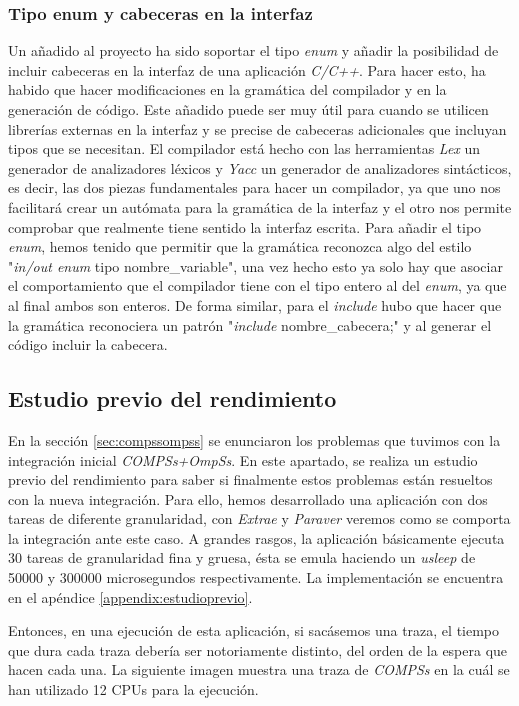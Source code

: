 \subsubsection{Tipo enum y cabeceras en la interfaz}


Un añadido al proyecto ha sido soportar el tipo \textit{enum} y añadir la posibilidad de incluir cabeceras en la interfaz de una aplicación \textit{C/C++}. Para hacer esto, ha habido que hacer modificaciones en la gramática del compilador y en la generación de código. Este añadido puede ser muy útil para cuando se utilicen librerías externas en la interfaz y se precise de cabeceras adicionales que incluyan tipos que se necesitan.
\bigskip
El compilador está hecho con las herramientas \textit{Lex} un generador de analizadores léxicos y \textit{Yacc} un generador de analizadores sintácticos, es decir, las dos piezas fundamentales para hacer un compilador, ya que uno nos facilitará crear un autómata para la gramática de la interfaz y el otro nos permite comprobar que realmente tiene sentido la interfaz escrita.
\bigskip
Para añadir el tipo \textit{enum}, hemos tenido que permitir que la gramática reconozca algo del estilo "\textit{in/out enum} tipo nombre\_variable", una vez hecho esto ya solo hay que asociar el comportamiento que el compilador tiene con el tipo entero al del \textit{enum}, ya que al final ambos son enteros. De forma similar, para el \textit{include} hubo que hacer que la gramática reconociera un patrón "\textit{include} nombre\_cabecera;" y al generar el código incluir la cabecera.


\subsection{Estudio previo del rendimiento}

En la sección \ref{sec:compssompss} se enunciaron los problemas que tuvimos con la integración inicial \textit{COMPSs+OmpSs}. En este apartado, se realiza un estudio previo del rendimiento para saber si finalmente estos problemas están resueltos con la nueva integración. Para ello, hemos desarrollado una aplicación con dos tareas de diferente granularidad, con \textit{Extrae} y \textit{Paraver} veremos como se comporta la integración ante este caso. A grandes rasgos, la aplicación básicamente ejecuta 30 tareas de granularidad fina y gruesa, ésta se emula haciendo un \textit{usleep} de 50000 y 300000 microsegundos respectivamente. La implementación se encuentra en el apéndice \ref{appendix:estudioprevio}.
\par\bigskip
Entonces, en una ejecución de esta aplicación, si sacásemos una traza, el tiempo que dura cada traza debería ser notoriamente distinto, del orden de la espera que hacen cada una. La siguiente imagen muestra una traza de \textit{COMPSs} en la cuál se han utilizado 12 CPUs para la ejecución.

